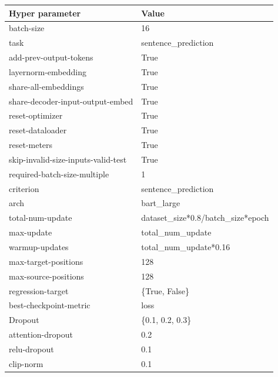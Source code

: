 \documentclass{article} %
\begin{document}
\label{sec:hp}
\begin{table}[h]
\centering
\begin{tabular}{@{}ll@{}}
\toprule


Hyper parameter             & Value                     \\ \midrule
batch-size                  & 16                    \\
task                        & sentence\_prediction  \\
add-prev-output-tokens      & True                  \\
layernorm-embedding         & True                  \\
share-all-embeddings        & True                  \\
share-decoder-input-output-embed         & True     \\
reset-optimizer             & True                  \\
reset-dataloader            & True                  \\
reset-meters                & True                  \\
skip-invalid-size-inputs-valid-test      & True     \\
required-batch-size-multiple             & 1        \\
criterion                   & sentence\_prediction  \\
arch                        & bart\_large           \\
total-num-update            & dataset\_size*0.8/batch\_size*epoch   \\
max-update                  & total\_num\_update   \\
warmup-updates              & total\_num\_update*0.16  \\
max-target-positions        & 128                   \\
max-source-positions        & 128                   \\
regression-target           & \{True, False\}       \\
best-checkpoint-metric      & loss                  \\
Dropout                     & \{0.1, 0.2, 0.3\}     \\
attention-dropout           & 0.2                   \\
relu-dropout                & 0.1                   \\
clip-norm                   & 0.1                   \\

\end{tabular}
\end{table}
\end{document}
